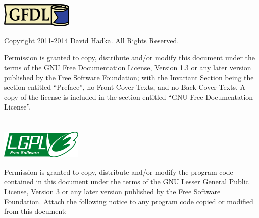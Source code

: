 %
%

\chapter*{}

\begin{center}
\includegraphics{gfdl.png}
\end{center}

\vspace{1em}
\noindent
Copyright 2011-2014 David Hadka.  All Rights Reserved.

\vspace{1em}
\noindent
Permission is granted to copy, distribute and/or modify this document under the terms of the GNU Free Documentation License, Version 1.3 or any later version published by the Free Software Foundation; with the Invariant Section being the section entitled ``Preface'', no Front-Cover Texts, and no Back-Cover Texts.  A copy of the license is included in the section entitled ``GNU Free Documentation License''.

\chapter*{}

\begin{center}
\includegraphics{lgpl.png}
\end{center}

\vspace{1em}
\noindent
Permission is granted to copy, distribute and/or modify the program code contained in this document under the terms of the GNU Lesser General Public License, Version 3 or any later version published by the Free Software Foundation.  Attach the following notice to any program code copied or modified from this document:

